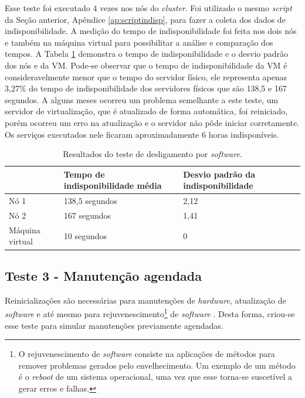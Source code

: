 Esse teste foi executado 4 vezes nos nós do \textit{cluster}. Foi utilizado o mesmo \textit{script} da Seção anterior, Apêndice 
\ref{ap:scriptindisp}, para fazer a coleta dos dados de indisponibilidade. A medição do tempo de indisponibilidade foi feita nos dois nós e 
também na máquina virtual para possibilitar a análise e comparação dos tempos. A Tabela \ref{tab:teste2resultados} demonstra o tempo de 
indisponibilidade e o desvio padrão dos nós e da \ac{VM}. Pode-se observar que o tempo de indisponibilidade da \ac{VM} é 
consideravelmente menor que o tempo do servidor físico, ele representa apenas 3,27\% do tempo de indisponibilidade dos servidores físicos que são 
138,5 e 167 segundos. A alguns meses ocorreu um problema semelhante a este teste, um servidor de virtualização, que é atualizado de forma 
automática, foi reiniciado, porém ocorreu um erro na atualização e o servidor não pôde iniciar corretamente. Os serviços executados nele ficaram 
aproximadamente 6 horas indisponíveis.

\begin{table}[h!]
\caption{Resultados do teste de desligamento por \textit{software}.}
\label{tab:teste2resultados}
\begin{center}
\begin{tabular}{|l|l|l|}\hline
 & \textbf{Tempo de indisponibilidade média} & \textbf{Desvio padrão da indisponibilidade} \\\hline
Nó 1 & 138,5 segundos & 2,12 \\\hline
Nó 2 & 167 segundos & 1,41 \\\hline
Máquina virtual & 10 segundos & 0 \\\hline
\end{tabular}
\end{center}
\end{table}


\subsection{Teste 3 - Manutenção agendada}

Reinicializações são necessárias para manutenções de \textit{hardware}, atualização de \textit{software} e até mesmo para 
rejuvenescimento\footnote{O rejuvenescimento de \textit{software} consiste na aplicações de métodos para remover problemas gerados pelo 
envelhecimento. Um exemplo de um método é o \textit{reboot} de um sistema operacional, uma vez que esse torna-se suscetível a gerar erros e 
falhas.} de \textit{software} \cite{melo2014}. Desta forma, criou-se esse teste para simular manutenções previamente agendadas.

